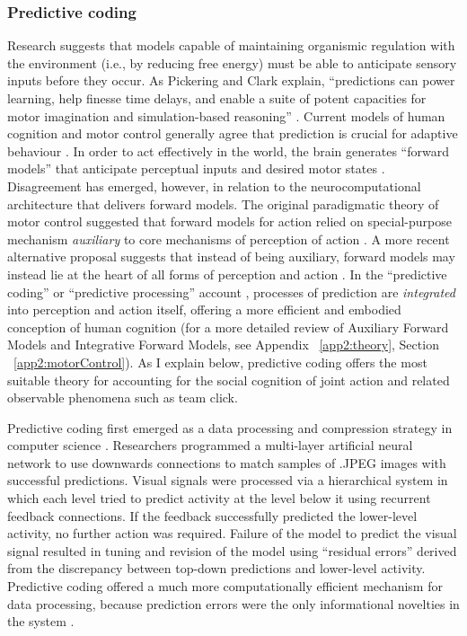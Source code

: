 \begin{CJK}{UTF8}{gbsn}
\subsubsection{Predictive coding\label{sect:predictiveCoding}}
Research suggests that models capable of maintaining organismic regulation with the environment (i.e., by reducing free energy) must be able to anticipate sensory inputs before they occur. As Pickering and Clark explain, ``predictions can power learning, help finesse time delays, and enable a suite of potent capacities for motor imagination and simulation-based reasoning'' \citep[6]{Pickering2014}.  Current models of human cognition and motor control generally agree that prediction is crucial for adaptive behaviour \citep{Wolpert2003,Clark2013}.  In order to act effectively in the world, the brain generates ``forward models'' that anticipate perceptual inputs and desired motor states \citep{Pickering2014}.  Disagreement has emerged, however, in relation to the neurocomputational architecture that delivers forward models.  The original paradigmatic theory of motor control suggested that forward models for action relied on special-purpose mechanism \textit{auxiliary} to core mechanisms of perception of action \citep{Wolpert1997}.  A more recent alternative proposal suggests that instead of being auxiliary, forward models may instead lie at the heart of all forms of perception and action \citep{Friston2010}.  In the ``predictive coding'' \citep{Rao1999} or ``predictive processing'' account \citep{Clark2013}, processes of prediction are \textit{integrated} into perception and action itself, offering a more efficient and embodied conception of human cognition (for a more detailed review of Auxiliary Forward Models and Integrative Forward Models, see Appendix ~\ref{app2:theory}, Section ~\ref{app2:motorControl}). As I explain below, predictive coding offers the most suitable theory for accounting for the social cognition of joint action and related observable phenomena such as team click.

Predictive coding first emerged as a data processing and compression strategy in computer science \citep{Rao1999}.  Researchers programmed a multi-layer artificial neural network to use downwards connections to match samples of .JPEG images with successful predictions. Visual signals were processed via a hierarchical system in which each level tried to predict activity at the level below it using recurrent feedback connections. If the feedback successfully predicted the lower-level activity, no further action was required. Failure of the model to predict the visual signal resulted in tuning and revision of the model using ``residual errors'' derived from the discrepancy between top-down predictions and lower-level activity.  Predictive coding offered a much more computationally efficient mechanism for data processing, because prediction errors were the only informational novelties in the system \citep{Clark2015}.


\end{CJK}
